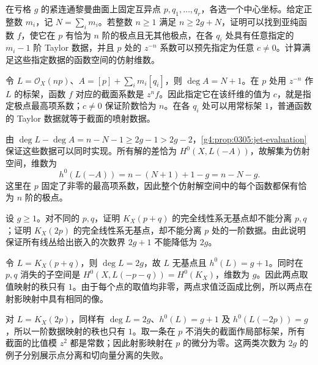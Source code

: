 \begin{exercise}
	\label{g4:ex:0305:jets}
	在亏格 \(g\) 的紧连通黎曼曲面上固定互异点 \(p,q_1,\ldots,q_r\)，各选一个中心坐标。给定正整数 \(m_i\)，记 \(N=\sum_i m_i\)。若整数 \(n\ge1\) 满足 \(n\ge2g+N\)，证明可以找到亚纯函数 \(f\)，使它在 \(p\) 有恰为 \(n\) 阶的极点且无其他极点，在各 \(q_i\) 处具有任意指定的 \(m_i-1\) 阶 Taylor 数据，并且 \(p\) 处的 \(z^{-n}\) 系数可以预先指定为任意 \(c\ne0\)。计算满足这些指定数据的函数空间的仿射维数。
\end{exercise}
\begin{solution}
	令 \(L=\mathcal O_X(np)\)、\(A=[p]+\sum_i m_i[q_i]\)，则 \(\deg A=N+1\)。在 \(p\) 处用 \(z^{-n}\) 作 \(L\) 的标架，函数 \(f\) 对应的截面系数是 \(z^n f\)。因此指定它在该纤维的值为 \(c\)，就是指定极点最高项系数；\(c\ne0\) 保证阶数恰为 \(n\)。在各 \(q_i\) 处可以用常标架 \(1\)，普通函数的 Taylor 数据就等于截面的喷射数据。

	由 \(\deg L-\deg A=n-N-1\ge2g-1>2g-2\)，\cref{g4:prop:0305:jet-evaluation}保证这些数据可以同时实现。所有解的差恰为 \(H^0(X,L(-A))\)，故解集为仿射空间，维数为
	\[
		h^0(L(-A))=n-(N+1)+1-g=n-N-g.
	\]
	这里在 \(p\) 固定了非零的最高项系数，因此整个仿射解空间中的每个函数都保有恰为 \(n\) 阶的极点。
\end{solution}

\begin{exercise}
	\label{g4:ex:0305:sharp-bounds}
	设 \(g\ge1\)。对不同的 \(p,q\)，证明 \(K_X(p+q)\) 的完全线性系无基点却不能分离 \(p,q\)；证明 \(K_X(2p)\) 的完全线性系无基点，却不能分离 \(p\) 处的一阶数据。由此说明保证所有线丛给出嵌入的次数界 \(2g+1\) 不能降低为 \(2g\)。
\end{exercise}
\begin{solution}
	令 \(L=K_X(p+q)\)，则 \(\deg L=2g\)，故 \(L\) 无基点且 \(h^0(L)=g+1\)。同时在 \(p,q\) 消失的子空间是 \(H^0(X,L(-p-q))=H^0(K_X)\)，维数为 \(g\)。因此两点取值映射的秩只有 \(1\)。由于每个点的取值均非零，两点求值泛函成比例，所以两点在射影映射中具有相同的像。

	对 \(L=K_X(2p)\)，同样有 \(\deg L=2g\)、\(h^0(L)=g+1\) 及 \(h^0(L(-2p))=g\)，所以一阶数据映射的秩也只有 \(1\)。取一条在 \(p\) 不消失的截面作局部标架，所有截面的比值模 \(z^2\) 都是常数；因此射影映射在 \(p\) 的微分为零。这两类次数为 \(2g\) 的例子分别展示点分离和切向量分离的失败。
\end{solution}


